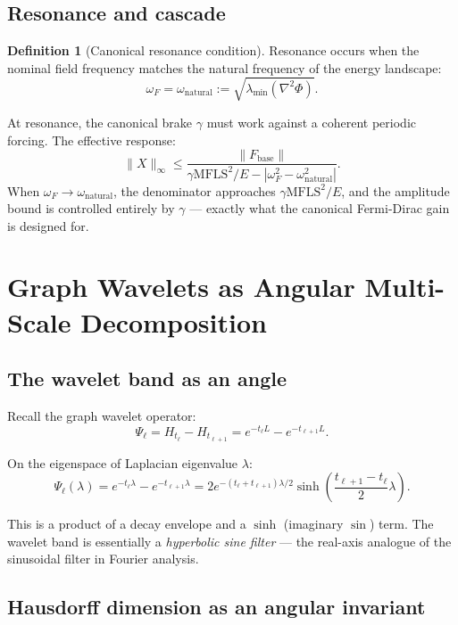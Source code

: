 \documentclass[11pt,a4paper,openany]{book}
\theoremstyle{definition}
\newtheorem{definition}[theorem]{Definition}
\newcommand{\norm}[1]{\left\|#1\right\|}
\newcommand{\Fbase}{F_{\mathrm{base}}}
\newcommand{\mfls}{\mathrm{MFLS}}
\begin{document}
\section{Resonance and cascade}

\begin{definition}[Canonical resonance condition]
Resonance occurs when the nominal field frequency matches the natural frequency of
the energy landscape:
\[
\omega_F = \omega_\mathrm{natural} := \sqrt{\lambda_\mathrm{min}(\nabla^2\Phi)}.
\]
\end{definition}

At resonance, the canonical brake $\gamma$ must work against a coherent periodic forcing.
The effective response:
\[
\|X\|_\infty \leq \frac{\norm{\Fbase}}{\gamma\mfls^2/E - |\omega_F^2 - \omega_\mathrm{natural}^2|}.
\]
When $\omega_F \to \omega_\mathrm{natural}$, the denominator approaches $\gamma\mfls^2/E$,
and the amplitude bound is controlled entirely by $\gamma$ — exactly what the canonical
Fermi-Dirac gain is designed for.

\chapter{Graph Wavelets as Angular Multi-Scale Decomposition}

\section{The wavelet band as an angle}

Recall the graph wavelet operator:
\[
\Psi_\ell = H_{t_\ell} - H_{t_{\ell+1}} = e^{-t_\ell L} - e^{-t_{\ell+1}L}.
\]

On the eigenspace of Laplacian eigenvalue $\lambda$:
\[
\Psi_\ell(\lambda) = e^{-t_\ell\lambda} - e^{-t_{\ell+1}\lambda} = 2e^{-(t_\ell+t_{\ell+1})\lambda/2}\sinh\!\left(\frac{t_{\ell+1}-t_\ell}{2}\lambda\right).
\]

This is a product of a decay envelope and a $\sinh$ (imaginary $\sin$) term.
The wavelet band is essentially a \emph{hyperbolic sine filter} — the real-axis
analogue of the sinusoidal filter in Fourier analysis.

\section{Hausdorff dimension as an angular invariant}
\end{document}

